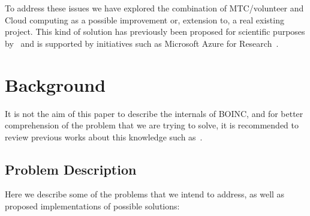 \documentclass[journal abbreviation, manuscript]{copernicus}
\begin{document}
To address these issues we have explored the combination of MTC/volunteer and Cloud computing as a possible improvement or, extension to, a real existing project. This kind of solution has previously been proposed for scientific purposes by~\cite{iosup2011} and is supported by initiatives such as Microsoft Azure for Research~\citep{azure2014}.
\section{Background}
It is not the aim of this paper to describe the internals of BOINC, and for better comprehension of the problem that we are trying to solve,  it is recommended to review previous works about this knowledge such as~\cite{Ries2011}.

\subsection{Problem Description}

Here we describe  some of the problems that we intend to address, as well as proposed implementations of possible solutions:
\end{document}

